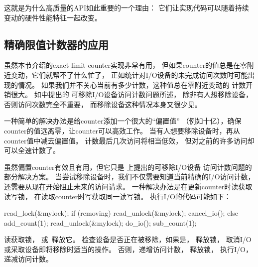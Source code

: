 这就是为什么高质量的API如此重要的一个理由：
它们让实现代码可以随着持续变动的硬件性能特征一起改变。

\QuickQuizEnd

\subsection{精确限值计数器的应用}
\label{sec:count:Applying Exact Limit Counters}

虽然本节介绍的exact limit counter实现非常有用，
但如果counter的值总是在零附近变动，它们就帮不了什么忙了，
正如统计对I/O设备的未完成访问次数时可能出现的情况。
如果我们并不关心当前有多少计数，这种值总在零附近变动的
计数开销很大。
如\QuickQuizRef{\QcountQIOcnt}中提出的
可移除I/O设备访问计数问题所述，
除非有人想移除设备，否则访问次数完全不重要，
而移除设备这种情况本身又很少见。

一种简单的解决办法是给counter添加一个很大的``偏置值''
（例如十亿），确保counter的值远离零，让counter可以高效工作。
当有人想要移除设备时，再从counter值中减去偏置值。
计数最后几次访问将相当低效，
但对之前的许多访问却可以全速计数了。

\QuickQuizEnd

虽然偏置counter有效且有用，但它只是
上提出的可移除I/O设备
访问计数问题的部分解决方案。
当尝试移除设备时，我们不仅需要知道当前精确的I/O访问计数，
还需要从现在开始阻止未来的访问请求。
一种解决办法是在更新counter时读获取读写锁，
在读取counter时写获取同一读写锁。
执行I/O的代码可能如下：

\begin{fcvlabel}
\begin{VerbatimN}[commandchars=\\\[\]]
read_lock(&mylock);		\lnlbl[acq]
if (removing) {			\lnlbl[check]
	read_unlock(&mylock);	\lnlbl[rel1]
	cancel_io();		\lnlbl[cancel]
} else {
	add_count(1);		\lnlbl[inc]
	read_unlock(&mylock);	\lnlbl[rel2]
	do_io();		\lnlbl[do]
	sub_count(1);		\lnlbl[dec]
}
\end{VerbatimN}
\end{fcvlabel}

\begin{fcvref}
读获取锁，
或~释放它。
检查设备是否正在被移除，如果是，
释放锁，
取消I/O或采取设备即将移除时适当的操作。
否则，递增访问计数，
释放锁，
执行I/O，
递减访问计数。
\end{fcvref}


